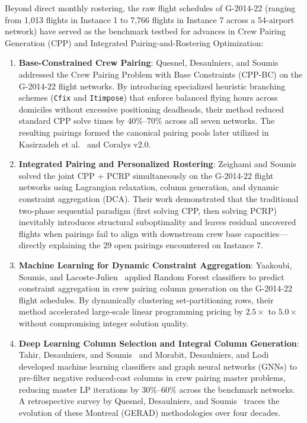 \documentclass[journal]{IEEEtran}
\begin{document}
Beyond direct monthly rostering, the raw flight schedules of G-2014-22 (ranging from 1,013 flights in Instance 1 to 7,766 flights in Instance 7 across a 54-airport network) have served as the benchmark testbed for advances in Crew Pairing Generation (CPP) and Integrated Pairing-and-Rostering Optimization:
\begin{enumerate}
    \item \textbf{Base-Constrained Crew Pairing}: Quesnel, Desaulniers, and Soumis~\cite{quesnel2017} addressed the Crew Pairing Problem with Base Constraints (CPP-BC) on the G-2014-22 flight networks. By introducing specialized heuristic branching schemes (\texttt{Cfix} and \texttt{Itimpose}) that enforce balanced flying hours across domiciles without excessive positioning deadheads, their method reduced standard CPP solve times by 40\%--70\% across all seven networks. The resulting pairings formed the canonical pairing pools later utilized in Kasirzadeh et al.~\cite{kasirzadeh2017} and Coralys v2.0.
    \item \textbf{Integrated Pairing and Personalized Rostering}: Zeighami and Soumis~\cite{zeighami2019} solved the joint CPP + PCRP simultaneously on the G-2014-22 flight networks using Lagrangian relaxation, column generation, and dynamic constraint aggregation (DCA). Their work demonstrated that the traditional two-phase sequential paradigm (first solving CPP, then solving PCRP) inevitably introduces structural suboptimality and leaves residual uncovered flights when pairings fail to align with downstream crew base capacities---directly explaining the 29 open pairings encountered on Instance 7.
    \item \textbf{Machine Learning for Dynamic Constraint Aggregation}: Yaakoubi, Soumis, and Lacoste-Julien~\cite{yaakoubi2020} applied Random Forest classifiers to predict constraint aggregation in crew pairing column generation on the G-2014-22 flight schedules. By dynamically clustering set-partitioning rows, their method accelerated large-scale linear programming pricing by $2.5\times$ to $5.0\times$ without compromising integer solution quality.
    \item \textbf{Deep Learning Column Selection and Integral Column Generation}: Tahir, Desaulniers, and Soumis~\cite{tahir2023} and Morabit, Desaulniers, and Lodi~\cite{morabit2021} developed machine learning classifiers and graph neural networks (GNNs) to pre-filter negative reduced-cost columns in crew pairing master problems, reducing master LP iterations by 30\%--60\% across the benchmark networks. A retrospective survey by Quesnel, Desaulniers, and Soumis~\cite{quesnel2020} traces the evolution of these Montreal (GERAD) methodologies over four decades.
\end{enumerate}
\end{document}
